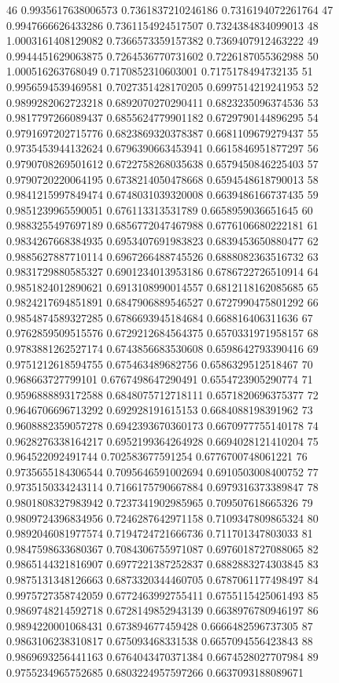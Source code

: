 46	0.9935617638006573	0.7361837210246186	0.7316194072261764
47	0.9947666626433286	0.7361154924517507	0.7324384834099013
48	1.0003161408129082	0.7366573359157382	0.7369407912463222
49	0.9944451629063875	0.7264536770731602	0.7226187055362988
50	1.000516263768049	0.7170852310603001	0.7175178494732135
51	0.9956594539469581	0.7027351428170205	0.6997514219241953
52	0.9899282062723218	0.6892070270290411	0.6823235096374536
53	0.9817797266089437	0.6855624779901182	0.6729790144896295
54	0.9791697202715776	0.6823869320378387	0.6681109679279437
55	0.9735453944132624	0.6796390663453941	0.6615846951877297
56	0.9790708269501612	0.6722758268035638	0.6579450846225403
57	0.9790720220064195	0.6738214050478668	0.6594548618790013
58	0.9841215997849474	0.6748031039320008	0.6639486166737435
59	0.9851239965590051	0.676113313531789	0.6658959036651645
60	0.9883255497697189	0.6856772047467988	0.6776106680222181
61	0.9834267668384935	0.6953407691983823	0.6839453650880477
62	0.9885627887710114	0.6967266488745526	0.6888082363516732
63	0.9831729880585327	0.6901234013953186	0.6786722726510914
64	0.9851824012890621	0.6913108990014557	0.6812118162085685
65	0.9824217694851891	0.6847906889546527	0.6727990475801292
66	0.9854874589327285	0.6786693945184684	0.668816406311636
67	0.9762859509515576	0.6729212684564375	0.6570331971958157
68	0.9783881262527174	0.6743856683530608	0.6598642793390416
69	0.9751212618594755	0.675463489682756	0.6586329512518467
70	0.968663727799101	0.6767498647290491	0.6554723905290774
71	0.9596888893172588	0.6848075712718111	0.6571820696375377
72	0.9646706696713292	0.692928191615153	0.6684088198391962
73	0.9608882359057278	0.6942393670360173	0.6670977755140178
74	0.9628276338164217	0.6952199364264928	0.6694028121410204
75	0.964522092491744	0.702583677591254	0.6776700748061221
76	0.9735655184306544	0.7095646591002694	0.6910503008400752
77	0.9735150334243114	0.7166175790667884	0.6979316373389847
78	0.9801808327983942	0.7237341902985965	0.709507618665326
79	0.9809724396834956	0.7246287642971158	0.7109347809865324
80	0.9892046081977574	0.7194724721666736	0.711701347803033
81	0.9847598633680367	0.7084306755971087	0.6976018727088065
82	0.9865144321816907	0.6977221387252837	0.6882883274303845
83	0.9875131348126663	0.6873320344460705	0.6787061177498497
84	0.9975727358742059	0.6772463992755411	0.6755115425061493
85	0.9869748214592718	0.6728149852943139	0.6638976780946197
86	0.9894220001068431	0.673894677459428	0.6666482596737305
87	0.9863106238310817	0.675093468331538	0.6657094556423843
88	0.9869693256441163	0.6764043470371384	0.6674528027707984
89	0.9755234965752685	0.6803224957597266	0.6637093188089671
